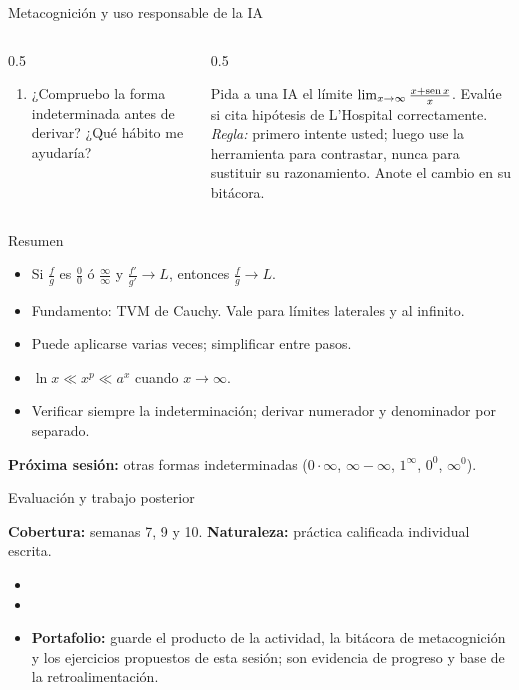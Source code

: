 \documentclass[10pt,aspectratio=169]{beamer}
\begin{document}
\begin{frame}{Metacognición y uso responsable de la IA}
  \small
  \begin{columns}[t]
    \begin{column}{0.5\textwidth}
      \begin{metacog}
        \begin{enumerate}
          \metacomun
          \item ¿Compruebo la forma indeterminada antes de derivar? ¿Qué hábito me ayudaría?
        \end{enumerate}
      \end{metacog}
    \end{column}
    \begin{column}{0.5\textwidth}
      \begin{iabox}
        Pida a una IA el límite $\lim_{x\to\infty}\frac{x+\operatorname{sen} x}{x}$. Evalúe si cita hipótesis de L'Hospital correctamente.\\[2pt]
        \textit{Regla:} primero intente usted; luego use la herramienta para contrastar, nunca para sustituir su razonamiento. Anote el cambio en su bitácora.
      \end{iabox}
    \end{column}
  \end{columns}
\end{frame}

\begin{frame}{Resumen}
  \begin{itemize}
    \item Si $\frac fg$ es $\frac00$ ó $\frac\infty\infty$ y $\frac{f'}{g'}\to L$, entonces $\frac fg\to L$.
    \item Fundamento: TVM de Cauchy. Vale para límites laterales y al infinito.
    \item Puede aplicarse varias veces; simplificar entre pasos.
    \item $\ln x\ll x^p\ll a^x$ cuando $x\to\infty$.
    \item Verificar siempre la indeterminación; derivar numerador y denominador por separado.
  \end{itemize}
  \vspace{3mm}
  \textbf{Próxima sesión:} otras formas indeterminadas ($0\cdot\infty$, $\infty-\infty$, $1^\infty$, $0^0$, $\infty^0$).
\end{frame}


\begin{frame}{Evaluación y trabajo posterior}
  \small
  \begin{evalbox}
    \textbf{Cobertura:} semanas 7, 9 y 10. \textbf{Naturaleza:} práctica calificada individual escrita.
  \end{evalbox}
  \begin{itemize}
    \item \criterios
    \item \declaracionia
    \item \textbf{Portafolio:} guarde el producto de la actividad, la bitácora de metacognición y los ejercicios propuestos de esta sesión; son evidencia de progreso y base de la retroalimentación.
  \end{itemize}
\end{frame}
\end{document}
